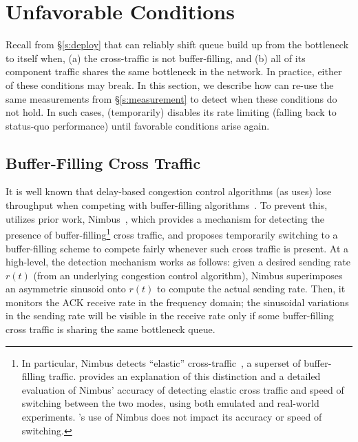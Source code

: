 \section{Unfavorable Conditions}\label{s:queue-ctl}

Recall from \S\ref{s:deploy} that \name can reliably shift queue build up from the bottleneck to itself when, (a) the cross-traffic is not buffer-filling, and (b) all of its component traffic shares the same bottleneck in the network.
In practice, either of these conditions may break. 
In this section, we describe how \name can re-use the same measurements from \S\ref{s:measurement} to detect when these conditions do not hold. In such cases, \name (temporarily) disables its rate limiting (falling back to status-quo performance) until favorable conditions arise again. 

\subsection{Buffer-Filling Cross Traffic}
\label{s:buffer-filling}


It is well known that delay-based congestion control algorithms (as \name uses) lose throughput when competing with buffer-filling algorithms~\cite{copa}. 
To prevent this, \name utilizes prior work, Nimbus~\cite{nimbus-arxiv}, which provides a mechanism for detecting the presence of buffer-filling\footnote{In particular, Nimbus detects ``elastic'' cross-traffic~\cite{nimbus-arxiv}, a superset of buffer-filling traffic. \cite{nimbus-arxiv} provides an explanation of this distinction
and a detailed evaluation of Nimbus' accuracy of detecting elastic cross traffic and speed of switching between the two modes, using both emulated and real-world experiments. \name{}'s use of Nimbus does not impact its accuracy or speed of switching.} 
cross traffic, and proposes temporarily switching to a buffer-filling scheme to compete fairly whenever such cross traffic is present.
At a high-level, the detection mechanism works as follows: given a desired sending rate $r(t)$ (from an underlying congestion control algorithm), Nimbus superimposes an asymmetric sinusoid onto $r(t)$ to compute the actual sending rate. Then, it monitors the ACK receive rate in the frequency domain; the sinusoidal variations in the sending rate will be visible in the receive rate only if some buffer-filling cross traffic is sharing the same bottleneck queue. 

